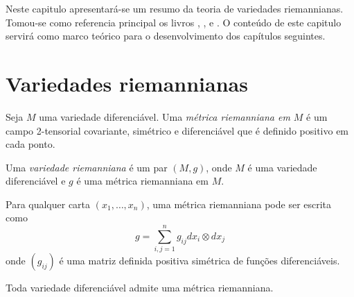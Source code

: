 Neste capitulo apresentará-se um resumo da teoria de variedades riemannianas.
Tomou-se como referencia principal os livros \cite{Lee2012}, \cite{Lee1997}, \cite{Carmo1988} e \cite{Gallot2004}.
O conteúdo de este capitulo servirá como marco teórico para o desenvolvimento dos capítulos seguintes.

\section{Variedades riemannianas}

\begin{definicao}
	Seja $M$ uma variedade diferenciável. Uma \emph{métrica riemanniana em $M$} é um campo 2-tensorial covariante, simétrico e diferenciável que é definido positivo em cada ponto.	
\end{definicao}

\begin{definicao}
	Uma \emph{variedade riemanniana} é um par $(M,g)$, onde $M$ é uma variedade diferenciável e $g$ é uma métrica riemanniana em $M$.
\end{definicao}

\begin{observacao}
	Para qualquer carta $(x_1, \ldots, x_n)$, uma métrica riemanniana pode ser escrita como
	\begin{equation*}
		g = \sum_{i,j=1}^n g_{ij} dx_i \otimes dx_j
	\end{equation*}
	onde $(g_{ij})$ é uma matriz definida positiva simétrica de funções diferenciáveis.
\end{observacao}

\begin{proposicao}
Toda variedade diferenciável admite uma métrica riemanniana.
\end{proposicao}


